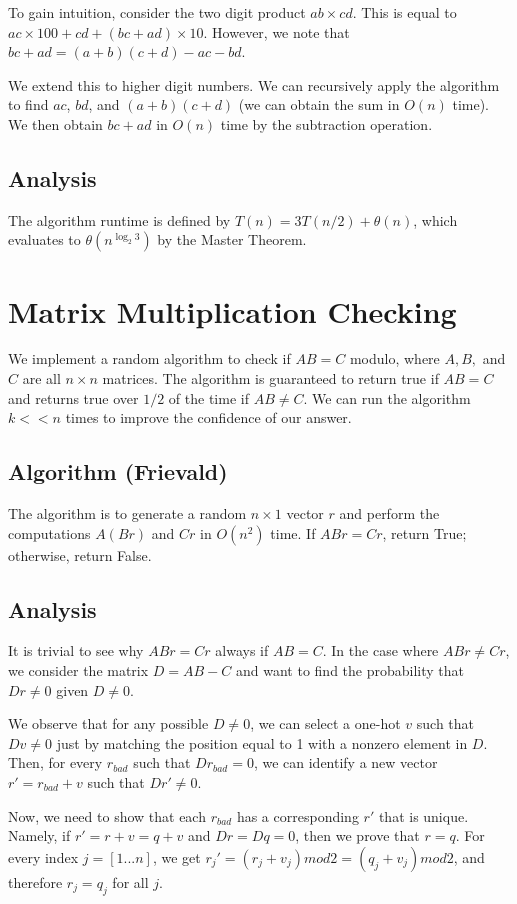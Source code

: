 \documentclass[10pt]{article}
\begin{document}
To gain intuition, consider the two digit product $ab \times cd$. This is equal to $ac \times 100 + cd + (bc + ad) \times 10$. However, we note that $bc + ad = (a + b) (c + d) - ac - bd$.

We extend this to higher digit numbers. We can recursively apply the algorithm to find $ac$, $bd$, and $(a+b)(c+d)$ (we can obtain the sum in $O(n)$ time). We then obtain $bc + ad$ in $O(n)$ time by the subtraction operation.
\subsection*{Analysis}
The algorithm runtime is defined by $T(n) = 3 T(n/2) + \theta (n)$, which evaluates to $\theta(n^{\log_2 3})$ by the Master Theorem.
\section{Matrix Multiplication Checking}
We implement a random algorithm to check if $AB = C$ modulo, where $A, B,$ and $C$ are all $n \times n$ matrices. The algorithm is guaranteed to return true if $AB = C$ and returns true over $1/2$ of the time if $AB \neq C$. We can run the algorithm $k << n$ times to improve the confidence of our answer.
\subsection*{Algorithm (Frievald)}
The algorithm is to generate a random $n \times 1$ vector $r$ and perform the computations $A(Br)$ and $Cr$ in $O(n^2)$ time. If $ABr = Cr$, return True; otherwise, return False.
\subsection*{Analysis}
It is trivial to see why $ABr = Cr$ always if $AB = C$. In the case where $ABr \neq Cr$, we consider the matrix $D = AB - C$ and want to find the probability that $Dr \neq 0$ given $D \neq 0$.

We observe that for any possible $D \neq 0$, we can select a one-hot $v$ such that $Dv \neq 0$ just by matching the position equal to 1 with a nonzero element in $D$. Then, for every $r_{bad}$ such that $D r_{bad} = 0$, we can identify a new vector $r' = r_{bad} + v$ such that $D r' \neq 0$.

Now, we need to show that each $r_{bad}$ has a corresponding $r'$ that is unique. Namely, if $r' = r + v = q + v$ and $Dr = Dq = 0$, then we prove that $r = q$. For every index $j = [1...n]$, we get $r_j' = (r_j + v_j) mod 2 = (q_j + v_j) mod 2$, and therefore $r_j = q_j$ for all $j$.
\end{document}
